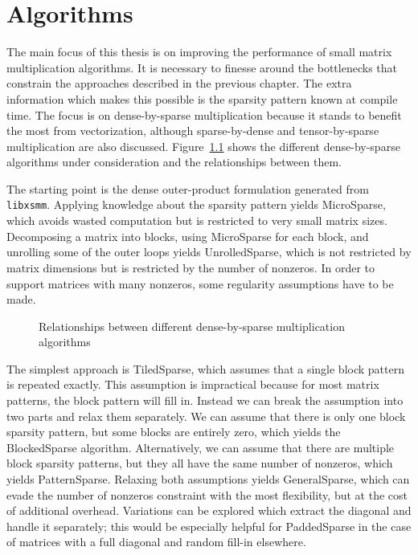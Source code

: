 \chapter{Algorithms}
\label{chapter:algs}

The main focus of this thesis is on improving the performance of small matrix multiplication algorithms. It is necessary to finesse around the bottlenecks that constrain the approaches described in the previous chapter. The extra information which makes this possible is the sparsity pattern known at compile time. The focus is on dense-by-sparse multiplication because it stands to benefit the most from vectorization, although sparse-by-dense and tensor-by-sparse multiplication are also discussed. Figure~\ref{fig:dxspfamilies} shows the different dense-by-sparse algorithms under consideration and the relationships between them. 

The starting point is the dense outer-product formulation generated from \texttt{libxsmm}. Applying knowledge about the sparsity pattern yields MicroSparse, which avoids wasted computation but is restricted to very small matrix sizes. Decomposing a matrix into blocks, using MicroSparse for each block, and unrolling some of the outer loops yields UnrolledSparse, which is not restricted by matrix dimensions but is restricted by the number of nonzeros. In order to support matrices with many nonzeros, some regularity assumptions have to be made. 

\begin{figure}[tbh]
  \centering
  
  \caption{Relationships between different dense-by-sparse multiplication algorithms}
  \label{fig:dxspfamilies}
\end{figure}


The simplest approach is TiledSparse, which assumes that a single block pattern is repeated exactly. This assumption is impractical because for most matrix patterns, the block pattern will fill in. Instead we can break the assumption into two parts and relax them separately. We can assume that there is only one block sparsity pattern, but some blocks are entirely zero, which yields the BlockedSparse algorithm. Alternatively, we can assume that there are multiple block sparsity patterns, but they all have the same number of nonzeros, which yields PatternSparse. Relaxing both assumptions yields GeneralSparse, which can evade the number of nonzeros constraint with the most flexibility, but at the cost of additional overhead. Variations can be explored which extract the diagonal and handle it separately; this would be especially helpful for PaddedSparse in the case of matrices with a full diagonal and random fill-in elsewhere.

